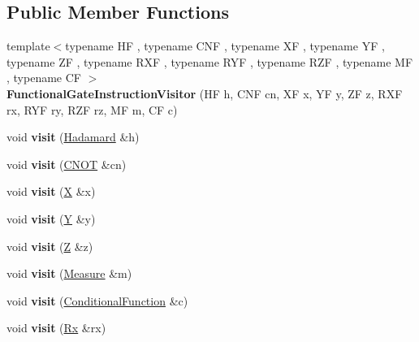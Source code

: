 \subsection*{Public Member Functions}
\begin{DoxyCompactItemize}
\item 
{\footnotesize template$<$typename HF , typename C\+NF , typename XF , typename YF , typename ZF , typename R\+XF , typename R\+YF , typename R\+ZF , typename MF , typename CF $>$ }\\{\bfseries Functional\+Gate\+Instruction\+Visitor} (HF h, C\+NF cn, XF x, YF y, ZF z, R\+XF rx, R\+YF ry, R\+ZF rz, MF m, CF c)\hypertarget{a00031_ab9e838d9bedab46a5ea54c9a0b99ef8a}{}\label{a00031_ab9e838d9bedab46a5ea54c9a0b99ef8a}

\item 
void {\bfseries visit} (\hyperlink{a00036}{Hadamard} \&h)\hypertarget{a00031_ac5245d34429dc112e7cd0e371108fcb5}{}\label{a00031_ac5245d34429dc112e7cd0e371108fcb5}

\item 
void {\bfseries visit} (\hyperlink{a00019}{C\+N\+OT} \&cn)\hypertarget{a00031_ad4eddafe8ca3906cd4aa5b98087a789a}{}\label{a00031_ad4eddafe8ca3906cd4aa5b98087a789a}

\item 
void {\bfseries visit} (\hyperlink{a00070}{X} \&x)\hypertarget{a00031_ac5d184daee7e755c9ede67b34bc2d091}{}\label{a00031_ac5d184daee7e755c9ede67b34bc2d091}

\item 
void {\bfseries visit} (\hyperlink{a00075}{Y} \&y)\hypertarget{a00031_a11dfa753a155346a45d7116a78c8f39f}{}\label{a00031_a11dfa753a155346a45d7116a78c8f39f}

\item 
void {\bfseries visit} (\hyperlink{a00076}{Z} \&z)\hypertarget{a00031_a4baf19da581fa9875739a227aba9cf60}{}\label{a00031_a4baf19da581fa9875739a227aba9cf60}

\item 
void {\bfseries visit} (\hyperlink{a00045}{Measure} \&m)\hypertarget{a00031_ad946faf8e2b6eff3e9e142907ec8e05a}{}\label{a00031_ad946faf8e2b6eff3e9e142907ec8e05a}

\item 
void {\bfseries visit} (\hyperlink{a00021}{Conditional\+Function} \&c)\hypertarget{a00031_a5cdb38902c241e7ae672a2631f1d61f3}{}\label{a00031_a5cdb38902c241e7ae672a2631f1d61f3}

\item 
void {\bfseries visit} (\hyperlink{a00061}{Rx} \&rx)\hypertarget{a00031_a6eb99e4b488773c750b7d9734ac1e885}{}\label{a00031_a6eb99e4b488773c750b7d9734ac1e885}


\end{DoxyCompactItemize}
